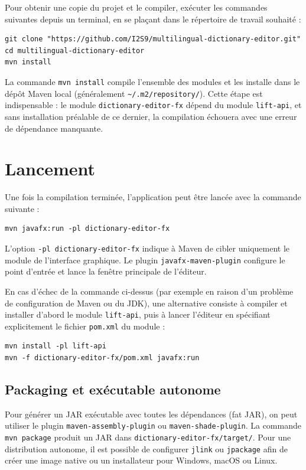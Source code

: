 \documentclass[11pt,twoside,openany]{book}
\begin{document}
Pour obtenir une copie du projet et le compiler, exécuter les commandes suivantes depuis un terminal, en se plaçant dans le répertoire de travail souhaité :

\begin{verbatim}
git clone "https://github.com/I2S9/multilingual-dictionary-editor.git"
cd multilingual-dictionary-editor
mvn install
\end{verbatim}

La commande \texttt{mvn install} compile l'ensemble des modules et les installe dans le dépôt Maven local (généralement \texttt{\textasciitilde/.m2/repository/}). Cette étape est indispensable : le module \texttt{dictionary-editor-fx} dépend du module \texttt{lift-api}, et sans installation préalable de ce dernier, la compilation échouera avec une erreur de dépendance manquante.

\section{Lancement}

Une fois la compilation terminée, l'application peut être lancée avec la commande suivante :

\begin{verbatim}
mvn javafx:run -pl dictionary-editor-fx
\end{verbatim}

L'option \texttt{-pl dictionary-editor-fx} indique à Maven de cibler uniquement le module de l'interface graphique. Le plugin \texttt{javafx-maven-plugin} configure le point d'entrée et lance la fenêtre principale de l'éditeur.

En cas d'échec de la commande ci-dessus (par exemple en raison d'un problème de configuration de Maven ou du JDK), une alternative consiste à compiler et installer d'abord le module \texttt{lift-api}, puis à lancer l'éditeur en spécifiant explicitement le fichier \texttt{pom.xml} du module :

\begin{verbatim}
mvn install -pl lift-api
mvn -f dictionary-editor-fx/pom.xml javafx:run
\end{verbatim}

\subsection{Packaging et exécutable autonome}

Pour générer un JAR exécutable avec toutes les dépendances (fat JAR), on peut utiliser le plugin \texttt{maven-assembly-plugin} ou \texttt{maven-shade-plugin}. La commande \texttt{mvn package} produit un JAR dans \texttt{dictionary-editor-fx/target/}. Pour une distribution autonome, il est possible de configurer \texttt{jlink} ou \texttt{jpackage} afin de créer une image native ou un installateur pour Windows, macOS ou Linux.
\end{document}
